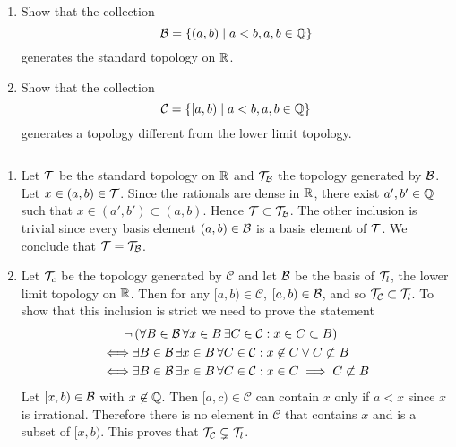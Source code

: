 \begin{ex}{13.8}
    ${}$
    \begin{enumerate}
        \item Show that the collection 
        $$
            \mathcal{B}=\left\{(a,b)\mid a<b, a,b\in\mathbb{Q} \right\} 
        $$
        generates the standard topology on $\mathbb{R}$.
    
        \item Show that the collection
        $$
            \mathcal{C}=\left\{[a,b)\mid a<b, a,b\in\mathbb{Q}\right\} 
        $$
        generates a topology different from the lower limit topology.
    \end{enumerate}
\end{ex}
\begin{sol}
    ${}$
    \begin{enumerate}
        \item Let $\mathcal{T}$ be the standard topology on $\mathbb{R}$ and $\mathcal{T}_{\mathcal{B}}$ the topology generated by $\mathcal{B}$. 
        Let $x\in(a,b)\in\mathcal{T}$. Since the rationals are dense in $\mathbb{R}$, there exist $a', b'\in\mathbb{Q}$ such that $x\in(a',b')\subset(a,b)$. 
        Hence $\mathcal{T}\subset\mathcal{T}_{\mathcal{B}}$. The other inclusion is trivial since every basis element $(a,b)\in\mathcal{B}$ is a basis element of $\mathcal{T}$. We conclude that $\mathcal{T}=\mathcal{T}_{\mathcal{B}}$.

        \item Let $\mathcal{T}_c$ be the topology generated by $\mathcal{C}$ and let $\mathcal{B}$ be the basis of $\mathcal{T}_l$, the lower limit topology on $\mathbb{R}$. 
        Then for any $[a,b)\in\mathcal{C}$, $[a,b)\in\mathcal{B}$, and so $\mathcal{T}_\mathcal{C}\subset\mathcal{T}_l$. To show that this inclusion is strict we need to prove the statement
        \begin{align*}
            \lnot&\left(\forall B\in\mathcal{B}\,\forall x\in B\,\exists C\in\mathcal{C}: x\in C\subset B\right)\\
            \iff&\exists B\in\mathcal{B}\, \exists x\in B\,\forall C\in\mathcal{C}:x\not\in C\vee C\not\subset B\\
            \iff&\exists B\in\mathcal{B}\, \exists x\in B\,\forall C\in\mathcal{C}:x\in C\implies C\not\subset B
        \end{align*}
        Let $[x,b)\in\mathcal{B}$ with $x\not\in\mathbb{Q}$. Then $[a,c)\in\mathcal{C}$ can contain $x$ only if $a<x$ since $x$ is irrational. Therefore there is no element in $\mathcal{C}$ that contains $x$ and is a subset of $[x,b)$.
        This proves that $\mathcal{T}_\mathcal{C}\subsetneq\mathcal{T}_l$.
    \end{enumerate}
\end{sol}
